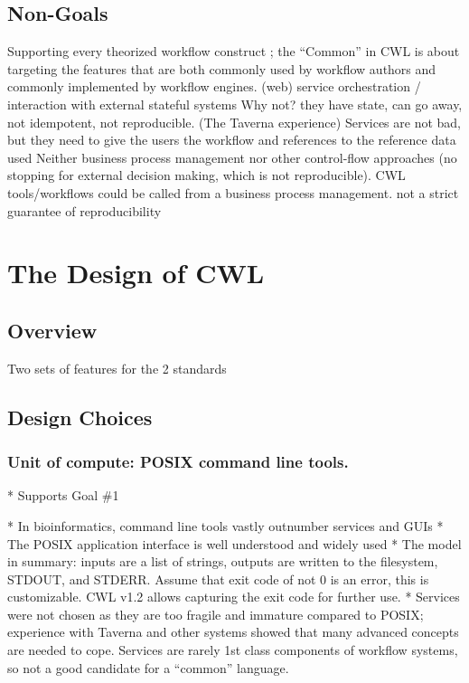 \subsection{Non-Goals}
Supporting every theorized workflow construct ; the “Common” in CWL is about targeting the features that are both commonly used by workflow authors and commonly implemented by workflow engines.
(web) service orchestration / interaction with external stateful systems 
Why not? they have state, can go away, not idempotent, not reproducible. (The Taverna experience) Services are not bad, but they need to give the users the workflow and references to the reference data used
Neither business process management nor other control-flow approaches
(no stopping for external decision making, which is not reproducible). CWL tools/workflows could be called from a business process management.
not a strict guarantee of reproducibility

\section{The Design of CWL}
\subsection{Overview}
Two sets of features for the 2 standards
\subsection{Design Choices}
\subsubsection{Unit of compute: POSIX command line tools.}

* Supports Goal \#1

* In bioinformatics, command line tools vastly outnumber services and GUIs
* The POSIX application interface is well understood and widely used
* The model in summary: inputs are a list of strings, outputs are written to the filesystem, STDOUT, and STDERR. Assume that exit code of not 0 is an error, this is customizable. CWL v1.2 allows capturing the exit code for further use.
* Services were not chosen as they are too fragile and immature compared to POSIX; experience with Taverna and other systems showed that many advanced concepts are needed to cope. Services are rarely 1st class components of workflow systems, so not a good candidate for a “common” language.

